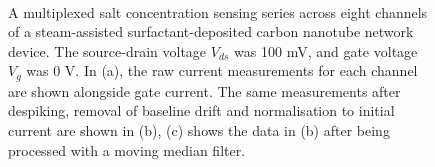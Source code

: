\documentclass[
  a4paper,
]{scrbook}
\begin{document}
\begin{figure}
\begin{minipage}[t]{0.70\linewidth}
{{}

}

\end{minipage}%
%
\begin{minipage}[t]{0.15\linewidth}

{\centering 

~

}

\end{minipage}%

\caption[Salt concentration sensing series across eight device channels,
shown alongside the same dataset after the use of various filtering
approaches.]{\label{fig-salt-conc-sensing}A multiplexed salt
concentration sensing series across eight channels of a steam-assisted
surfactant-deposited carbon nanotube network device. The source-drain
voltage \(V_{ds}\) was 100 mV, and gate voltage \(V_g\) was 0 V. In (a),
the raw current measurements for each channel are shown alongside gate
current. The same measurements after despiking, removal of baseline
drift and normalisation to initial current are shown in (b), (c) shows
the data in (b) after being processed with a moving median filter.}

\end{figure}
\end{document}
